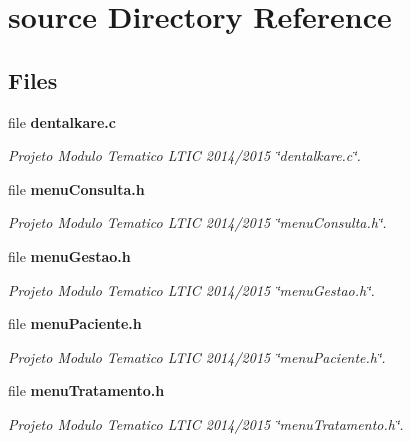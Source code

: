 \section{source Directory Reference}
\label{dir_b2f33c71d4aa5e7af42a1ca61ff5af1b}
\subsection*{Files}
\begin{DoxyCompactItemize}
\item 
file {\bf dentalkare.\+c}
\begin{DoxyCompactList}\small\item\em Projeto Modulo Tematico L\+T\+I\+C 2014/2015 \char`\"{}dentalkare.\+c\char`\"{}. \end{DoxyCompactList}\item 
file {\bf menu\+Consulta.\+h}
\begin{DoxyCompactList}\small\item\em Projeto Modulo Tematico L\+T\+I\+C 2014/2015 \char`\"{}menu\+Consulta.\+h\char`\"{}. \end{DoxyCompactList}\item 
file {\bf menu\+Gestao.\+h}
\begin{DoxyCompactList}\small\item\em Projeto Modulo Tematico L\+T\+I\+C 2014/2015 \char`\"{}menu\+Gestao.\+h\char`\"{}. \end{DoxyCompactList}\item 
file {\bf menu\+Paciente.\+h}
\begin{DoxyCompactList}\small\item\em Projeto Modulo Tematico L\+T\+I\+C 2014/2015 \char`\"{}menu\+Paciente.\+h\char`\"{}. \end{DoxyCompactList}\item 
file {\bf menu\+Tratamento.\+h}
\begin{DoxyCompactList}\small\item\em Projeto Modulo Tematico L\+T\+I\+C 2014/2015 \char`\"{}menu\+Tratamento.\+h\char`\"{}. \end{DoxyCompactList}\end{DoxyCompactItemize}
